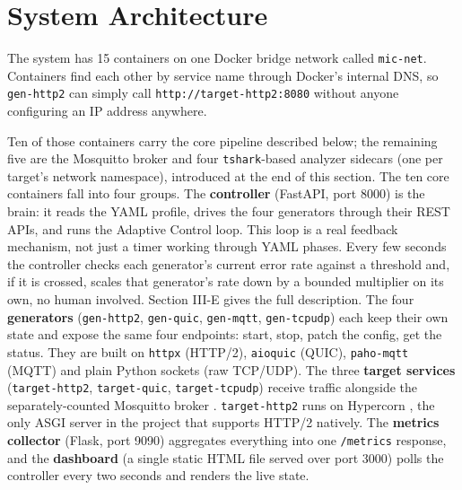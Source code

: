 \section{System Architecture}

The system has 15 containers on one Docker bridge network called
\texttt{mic-net}. Containers find each other by service name through Docker's
internal DNS, so \texttt{gen-http2} can simply call
\texttt{http://target-http2:8080} without anyone configuring an IP address
anywhere.

Ten of those containers carry the core pipeline described below; the
remaining five are the Mosquitto broker and four \texttt{tshark}-based
analyzer sidecars (one per target's network namespace), introduced at the
end of this section. The ten core containers fall into four groups. The \textbf{controller} (FastAPI,
port 8000) is the brain: it reads the YAML profile, drives the four generators
through their REST APIs, and runs the Adaptive Control loop. This loop is a
real feedback mechanism, not just a timer working through YAML phases. Every
few seconds the controller checks each generator's current error rate against
a threshold and, if it is crossed, scales that generator's rate down by a
bounded multiplier on its own, no human involved. Section III-E gives the full
description. The four \textbf{generators} (\texttt{gen-http2}, \texttt{gen-quic},
\texttt{gen-mqtt}, \texttt{gen-tcpudp}) each keep their own state and expose
the same four endpoints: start, stop, patch the config, get the status. They
are built on \texttt{httpx} (HTTP/2), \texttt{aioquic} \cite{aioquic} (QUIC),
\texttt{paho-mqtt} \cite{pahomqtt} (MQTT) and plain Python sockets (raw
TCP/UDP). The three \textbf{target services} (\texttt{target-http2},
\texttt{target-quic}, \texttt{target-tcpudp}) receive traffic alongside the
separately-counted Mosquitto broker \cite{mosquitto}. \texttt{target-http2} runs on Hypercorn
\cite{hypercorn}, the only ASGI server in the project that supports HTTP/2
natively. The \textbf{metrics collector} (Flask, port 9090) aggregates
everything into one \texttt{/metrics} response, and the \textbf{dashboard}
(a single static HTML file served over port 3000) polls the controller every
two seconds and renders the live state.

